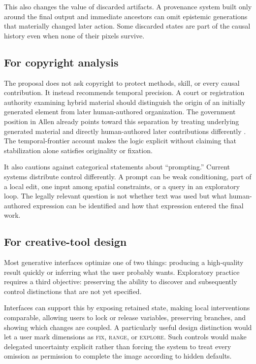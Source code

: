 \documentclass[11pt]{article}
\newcommand{\term}[1]{\textsc{#1}}
\begin{document}
This also changes the value of discarded artifacts. A provenance system built only around the final output and immediate ancestors can omit epistemic generations that materially changed later action. Some discarded states are part of the causal history even when none of their pixels survive.

\subsection{For copyright analysis}

The proposal does not ask copyright to protect methods, skill, or every causal contribution. It instead recommends temporal precision. A court or registration authority examining hybrid material should distinguish the origin of an initially generated element from later human-authored organization. The government position in Allen already points toward this separation by treating underlying generated material and directly human-authored later contributions differently \citep{AllenGov2026Brief}. The temporal-frontier account makes the logic explicit without claiming that stabilization alone satisfies originality or fixation.

It also cautions against categorical statements about ``prompting.'' Current systems distribute control differently. A prompt can be weak conditioning, part of a local edit, one input among spatial constraints, or a query in an exploratory loop. The legally relevant question is not whether text was used but what human-authored expression can be identified and how that expression entered the final work.

\subsection{For creative-tool design}

Most generative interfaces optimize one of two things: producing a high-quality result quickly or inferring what the user probably wants. Exploratory practice requires a third objective: preserving the ability to discover and subsequently control distinctions that are not yet specified.

Interfaces can support this by exposing retained state, making local interventions comparable, allowing users to lock or release variables, preserving branches, and showing which changes are coupled. A particularly useful design distinction would let a user mark dimensions as \term{fix}, \term{range}, or \term{explore}. Such controls would make delegated uncertainty explicit rather than forcing the system to treat every omission as permission to complete the image according to hidden defaults.
\end{document}
